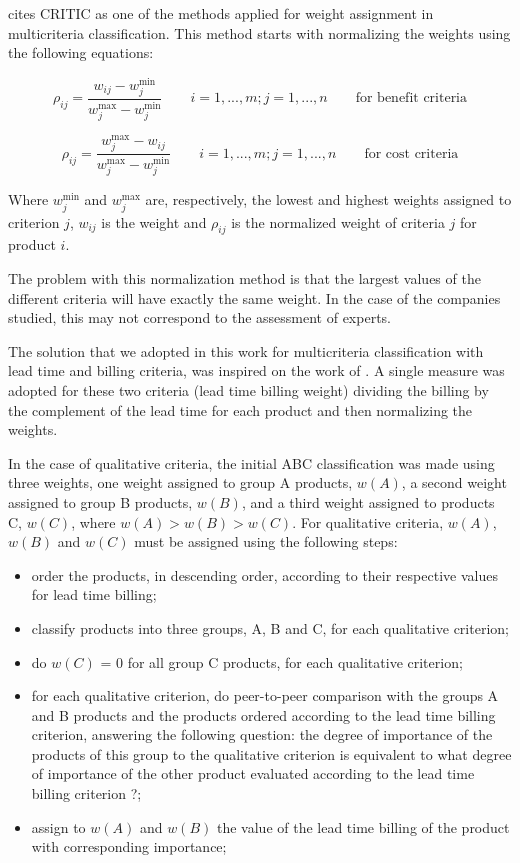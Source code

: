 \documentclass[10pt,fleqn,a4paper,twoside]{article}
\begin{document}
	\citet{Odu2019} cites CRITIC as one of the methods applied for weight assignment in multicriteria classification. This method starts with normalizing the weights using the following equations:
	
	\begin{equation}
		\rho_{ij} = \frac{w_{ij} - w_{j}^{\min}}{w_{j}^{\max} - w_{j}^{\min}} \qquad i=1,...,m; j = 1, ..., n \qquad \textrm{for benefit criteria}
	\end{equation}
	
	\begin{equation}
		\rho_{ij} = \frac{w_{j}^{\max} - w_{ij}}{w_{j}^{\max} - w_{j}^{\min}} \qquad i=1,...,m; j = 1, ..., n \qquad \textrm{for cost criteria}
	\end{equation}
	
	Where $w_{j}^{\min}$ and $w_{j}^{\max}$ are, respectively, the lowest and highest weights assigned to criterion $j$, $w_{ij}$ is the weight and $\rho_{ij}$ is the normalized weight of criteria $j$ for product $i$. 
	 
	The problem with this normalization method is that the largest values of the different criteria will have exactly the same weight. In the case of the companies studied, this may not correspond to the assessment of experts. 
	
The solution that we adopted in this work for multicriteria classification with lead time and billing criteria, was inspired on the work of \cite{Williams1984}. A single measure was adopted for these two criteria (lead time billing  weight) dividing the billing by the complement of the lead time for each product and then normalizing the weights.

In the case of qualitative criteria, the initial ABC classification was made using three weights, one weight assigned to group A products, $w(A)$, a second weight assigned to group B products, $w(B)$, and a third weight assigned to products C, $w(C)$, where $w(A) > w(B) > w(C)$. For qualitative criteria, $w(A)$, $w(B)$ and $w(C)$ must be assigned using the following steps:
	
\begin{itemize}
\item order the products, in descending order, according to their respective values for lead time billing;
\item classify products into three groups, A, B and C, for each qualitative criterion;
\item do $w(C)$ = 0 for all group C products, for each qualitative criterion;
\item for each qualitative criterion, do peer-to-peer comparison with the groups A and B products and the products ordered according to the lead time billing criterion, answering the following question: the degree of importance of the products of this group to the qualitative criterion is equivalent to what degree of importance of the other product evaluated according to the lead time billing criterion ?;
\item assign to $w(A)$ and $w(B)$ the value of the lead time billing of the product with corresponding importance; 
\end{itemize}	
\end{document}
